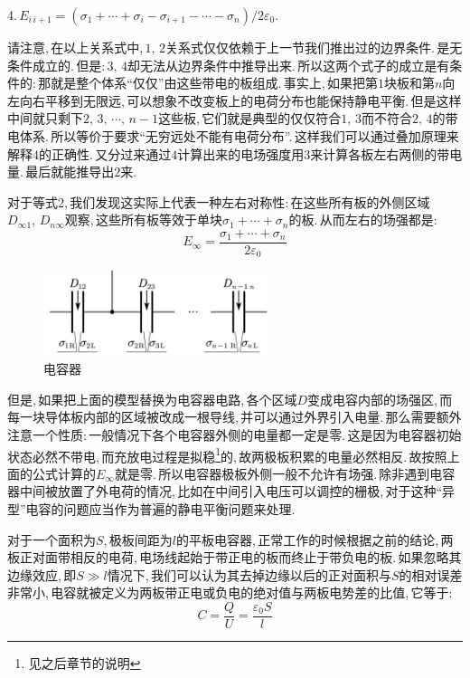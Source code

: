 4.\,$E_{i\,i+1}=(\sigma_1+\cdots+\sigma_i-\sigma_{i+1}-\cdots-\sigma_n)/2\varepsilon_0$.

请注意,\,在以上关系式中,\,$1,\,2$关系式仅仅依赖于上一节我们推出过的边界条件.\,是无条件成立的.\,但是:\,$3,\,4$却无法从边界条件中推导出来.\,所以这两个式子的成立是有条件的:\,那就是整个体系``仅仅''由这些带电的板组成.\,事实上,\,如果把第$1$块板和第$n$向左向右平移到无限远,\,可以想象不改变板上的电荷分布也能保持静电平衡.\,但是这样中间就只剩下$2,\,3,\,\cdots,\,n-1$这些板,\,它们就是典型的仅仅符合$1,\,3$而不符合$2,\,4$的带电体系.\,所以等价于要求``无穷远处不能有电荷分布''.\,这样我们可以通过叠加原理来解释$4$的正确性.\,又分过来通过$4$计算出来的电场强度用$3$来计算各板左右两侧的带电量.\,最后就能推导出$2$来.

对于等式$2$,\,我们发现这实际上代表一种左右对称性:\,在这些所有板的外侧区域$D_{\infty 1},\,D_{n\infty}$观察,\,这些所有板等效于单块$\sigma_1+\cdots+\sigma_n$的板.\,从而左右的场强都是:
\[E_\infty=\frac{\sigma_1+\cdots+\sigma_n}{2\varepsilon_0}\]
\begin{figure}[H]
\centering
\includegraphics[width=0.6\textwidth]{image/7-2-7.png}
\caption{电容器}
\end{figure}

但是,\,如果把上面的模型替换为电容器电路,\,各个区域$D$变成电容内部的场强区,\,而每一块导体板内部的区域被改成一根导线,\,并可以通过外界引入电量.\,那么需要额外注意一个性质:\,一般情况下各个电容器外侧的电量都一定是零.\,这是因为电容器初始状态必然不带电,\,而充放电过程是拟稳\footnote{见之后章节的说明}的,\,故两极板积累的电量必然相反.\,故按照上面的公式计算的$E_\infty$就是零.\,所以电容器极板外侧一般不允许有场强.\,除非遇到电容器中间被放置了外电荷的情况,\,比如在中间引入电压可以调控的栅极,\,对于这种``异型''电容的问题应当作为普遍的静电平衡问题来处理.

\vspace{1cm}
对于一个面积为$S$,\,极板间距为$l$的平板电容器,\,正常工作的时候根据之前的结论,\,两板正对面带相反的电荷,\,电场线起始于带正电的板而终止于带负电的板.\,如果忽略其边缘效应,\,即$S\gg l$情况下,\,我们可以认为其去掉边缘以后的正对面积与$S$的相对误差非常小,\,电容就被定义为两板带正电或负电的绝对值与两板电势差的比值,\,它等于:
\[C=\frac{Q}{U}=\frac{\varepsilon_0S}{l}\]

